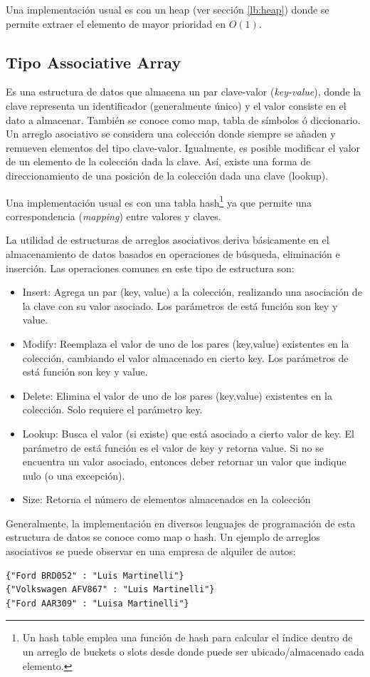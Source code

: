 Una implementación usual es con un heap (ver sección \ref{lb:heap}) donde se permite extraer el elemento de mayor prioridad en $O(1)$.

\subsection{Tipo Associative Array}

Es una estructura de datos que almacena un par clave-valor (\textit{key-value}), donde la clave representa un identificador (generalmente único) y el valor consiste en el dato a almacenar. También se conoce como map, tabla de símbolos ó diccionario. Un arreglo asociativo se considera una colección donde siempre se añaden y remueven elementos del tipo clave-valor. Igualmente, es posible modificar el valor de un elemento de la colección dada la clave. Así, existe una forma de direccionamiento de una posición de la colección dada una clave (lookup).

Una implementación usual es con una tabla hash\footnote{Un hash table emplea una función de hash para calcular el índice dentro de un arreglo de buckets o slots desde donde puede ser ubicado/almacenado cada elemento.} ya que permite una correspondencia (\textit{mapping}) entre valores y claves.

La utilidad de estructuras de arreglos asociativos deriva básicamente en el almacenamiento de datos basados en operaciones de búsqueda, eliminación e inserción. Las operaciones comunes en este tipo de estructura son:
\begin{itemize}
\item Insert: Agrega un par (key, value) a la colección, realizando una asociación de la clave con su valor asociado. Los parámetros de está función son key y value.
\item Modify: Reemplaza el valor de uno de los pares (key,value) existentes en la colección, cambiando el valor almacenado en cierto key. Los parámetros de está función son key y value.
\item Delete: Elimina el valor de uno de los pares (key,value) existentes en la colección. Solo requiere el parámetro key.
\item Lookup: Busca el valor (si existe) que está asociado a cierto valor de key. El parámetro de está función es el valor de key y retorna value. Si no se encuentra un valor asociado, entonces deber retornar un valor que indique nulo (o una excepción).
\item Size: Retorna el número de elementos almacenados en la colección
\end{itemize}
Generalmente, la implementación en diversos lenguajes de programación de esta estructura de datos se conoce como map o hash. Un ejemplo de arreglos asociativos se puede observar en una empresa de alquiler de autos:
\begin{lstlisting}[upquote=true, language=html]
{"Ford BRD052" : "Luis Martinelli"}
{"Volkswagen AFV867" : "Luis Martinelli"}
{"Ford AAR309" : "Luisa Martinelli"}
\end{lstlisting}


